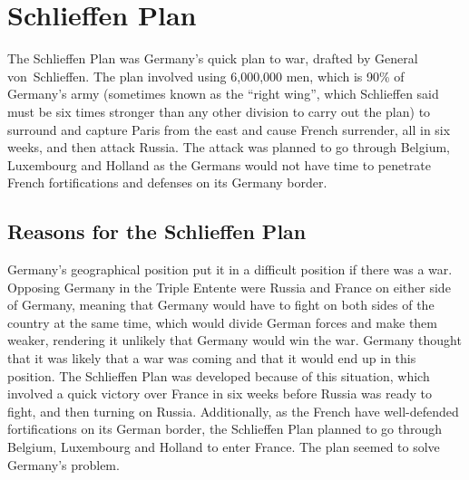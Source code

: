 \documentclass[a4paper,numbers=endperiod,most,twoside,english,final,openany]{scrbook} %
\begin{document}


\chapter{Schlieffen Plan}

The Schlieffen Plan was Germany's quick plan to war, drafted by General von~Schlieffen. The plan involved using 6,000,000 men, which is 90\% of Germany's army (sometimes known as the ``right wing'', which Schlieffen said must be six times stronger than any other division to carry out the plan) to surround and capture Paris from the east and cause French surrender, all in six weeks, and then attack Russia. The attack was planned to go through Belgium, Luxembourg and Holland as the Germans would not have time to penetrate French fortifications and defenses on its Germany border.

\section{Reasons for the Schlieffen Plan}

Germany's geographical position put it in a difficult position if there was a war.  Opposing Germany in the Triple Entente were Russia and France on either side of Germany, meaning that Germany would have to fight on both sides of the country at the same time, which would divide German forces and make them weaker, rendering it unlikely that Germany would win the war.  Germany thought that it was likely that a war was coming and that it would end up in this position.  The Schlieffen Plan was developed because of this situation, which involved a quick victory over France in six weeks before Russia was ready to fight, and then turning on Russia.  Additionally, as the French have well-defended fortifications on its German border, the Schlieffen Plan planned to go through Belgium, Luxembourg and Holland to enter France.  The plan seemed to solve Germany's problem.
\end{document}
